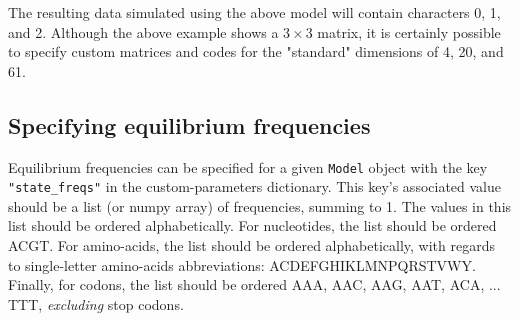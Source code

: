 \documentclass{article}
\newcommand{\code}[1]{\texttt{\small{#1}}}
\begin{document}
The resulting data simulated using the above model will contain characters 0, 1, and 2. Although the above example shows a $3\times3$ matrix, it is certainly possible to specify custom matrices and codes for the "standard" dimensions of 4, 20, and 61. 



\subsection{Specifying equilibrium frequencies}\label{sec:freqs}

Equilibrium frequencies can be specified for a given \code{Model} object with the key \code{"state\_freqs"} in the custom-parameters dictionary. This key's associated value should be a list (or numpy array) of frequencies, summing to 1. The values in this list should be ordered alphabetically. For nucleotides, the list should be ordered ACGT. For amino-acids, the list should be ordered alphabetically, with regards to single-letter amino-acids abbreviations: ACDEFGHIKLMNPQRSTVWY. Finally, for codons, the list should be ordered AAA, AAC, AAG, AAT, ACA, ... TTT, \emph{excluding} stop codons.
\end{document}
